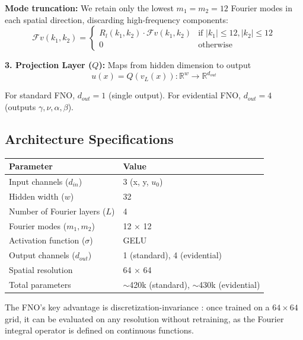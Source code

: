 \textbf{Mode truncation:} We retain only the lowest $m_1 = m_2 = 12$ Fourier modes in each spatial direction, discarding high-frequency components:
\begin{equation}
\mathcal{F}v(k_1, k_2) = \begin{cases}
R_l(k_1, k_2) \cdot \mathcal{F}v(k_1, k_2) & \text{if } |k_1| \leq 12, |k_2| \leq 12 \\
0 & \text{otherwise}
\end{cases}
\end{equation}

\textbf{3. Projection Layer ($Q$):} Maps from hidden dimension to output
\begin{equation}
u(x) = Q(v_L(x)) : \mathbb{R}^w \rightarrow \mathbb{R}^{d_{out}}
\end{equation}

For standard FNO, $d_{out} = 1$ (single output). For evidential FNO, $d_{out} = 4$ (outputs $\gamma, \nu, \alpha, \beta$).

\subsection{Architecture Specifications}

\begin{table}[h]
\centering
\begin{tabular}{ll}
\toprule
\textbf{Parameter} & \textbf{Value} \\
\midrule
Input channels ($d_{in}$) & 3 (x, y, $u_0$) \\
Hidden width ($w$) & 32 \\
Number of Fourier layers ($L$) & 4 \\
Fourier modes ($m_1, m_2$) & 12 × 12 \\
Activation function ($\sigma$) & GELU \\
Output channels ($d_{out}$) & 1 (standard), 4 (evidential) \\
Spatial resolution & 64 × 64 \\
Total parameters & $\sim$420k (standard), $\sim$430k (evidential) \\
\bottomrule
\end{tabular}
\end{table}

The FNO's key advantage is discretization-invariance \cite{li2020fourier}: once trained on a $64 \times 64$ grid, it can be evaluated on any resolution without retraining, as the Fourier integral operator is defined on continuous functions.

